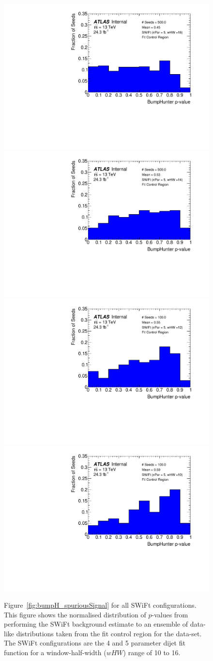 \begin{figure}[!htb]
 {                                                    
  \includegraphics[width=0.3\linewidth, angle=0]{figs/Dibjet/LowMass/FitStudy_min566/pVal_bumpHunter_corrFitCR_5para_low16_high16.pdf}
}                                                                                              
 {                                                    
  \includegraphics[width=0.3\linewidth, angle=0]{figs/Dibjet/LowMass/FitStudy_min566/pVal_bumpHunter_corrFitCR_5para_low14_high14.pdf}
}                                                                                              
 {                                                    
  \includegraphics[width=0.3\linewidth, angle=0]{figs/Dibjet/LowMass/FitStudy_min566/pVal_bumpHunter_corrFitCR_5para_low12_high12.pdf}
}                                                                                              
 {                                                    
  \includegraphics[width=0.3\linewidth, angle=0]{figs/Dibjet/LowMass/FitStudy_min566/pVal_bumpHunter_corrFitCR_5para_low10_high10.pdf}
}
\vspace{10pt}
\caption[Figure~\ref{fig:bumpH_spuriousSignal} for all SWiFt configurations.]
 {\label{fig:app-bumpH_spuriousSignal}
 Figure~\ref{fig:bumpH_spuriousSignal} for all SWiFt configurations.
  This figure shows the normalised distribution of \bh{} $p$-values from performing the SWiFt background estimate to an ensemble of
  data-like distributions taken from the fit control region for the \lm{} data-set.
  The SWiFt configurations are the 4 and 5 parameter dijet fit function for a window-half-width ($wHW$) range of 10 to 16.
}
\end{figure}


